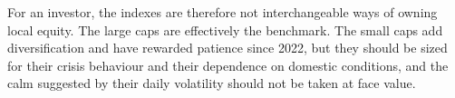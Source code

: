 \documentclass[11pt,preprint]{elsarticle}
\numberwithin{equation}{section}
\numberwithin{figure}{section}
\numberwithin{table}{section}
\begin{document}
For an investor, the indexes are therefore not interchangeable ways of
owning local equity. The large caps are effectively the benchmark. The
small caps add diversification and have rewarded patience since 2022,
but they should be sized for their crisis behaviour and their dependence
on domestic conditions, and the calm suggested by their daily volatility
should not be taken at face value.


\end{document}
